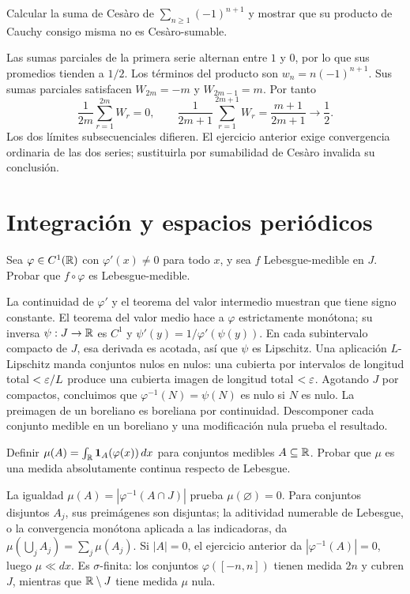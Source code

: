 \begin{ejercicio}\label{ej:v4-l01-8}
Calcular la suma de Cesàro de $\sum_{n\geq1}(-1)^{n+1}$ y mostrar que su producto de Cauchy consigo misma no es Cesàro-sumable.
\end{ejercicio}
\begin{solucion}
Las sumas parciales de la primera serie alternan entre $1$ y $0$, por lo que sus promedios tienden a $1/2$. Los términos del producto son $w_n=n(-1)^{n+1}$. Sus sumas parciales satisfacen $W_{2m}=-m$ y $W_{2m-1}=m$. Por tanto
\[
 \frac1{2m}\sum_{r=1}^{2m}W_r=0,
 \qquad \frac1{2m+1}\sum_{r=1}^{2m+1}W_r=\frac{m+1}{2m+1}\longrightarrow\frac12.
\]
Los dos límites subsecuenciales difieren. El ejercicio anterior exige convergencia ordinaria de las dos series; sustituirla por sumabilidad de Cesàro invalida su conclusión.
\end{solucion}

\chapter{Integración y espacios periódicos}

\begin{ejercicio}\label{ej:v4-l02-1}
Sea $\varphi\in C^1(\mathbb R)$ con $\varphi'(x)\ne0$ para todo $x$, y sea $f$ Lebesgue-medible en $J$. Probar que $f\circ\varphi$ es Lebesgue-medible.
\end{ejercicio}
\begin{solucion}
La continuidad de $\varphi'$ y el teorema del valor intermedio muestran que tiene signo constante. El teorema del valor medio hace a $\varphi$ estrictamente monótona; su inversa $\psi:J\to\mathbb R$ es $C^1$ y $\psi'(y)=1/\varphi'(\psi(y))$. En cada subintervalo compacto de $J$, esa derivada es acotada, así que $\psi$ es Lipschitz. Una aplicación $L$-Lipschitz manda conjuntos nulos en nulos: una cubierta por intervalos de longitud total $<\varepsilon/L$ produce una cubierta imagen de longitud total $<\varepsilon$. Agotando $J$ por compactos, concluimos que $\varphi^{-1}(N)=\psi(N)$ es nulo si $N$ es nulo. La preimagen de un boreliano es boreliana por continuidad. Descomponer cada conjunto medible en un boreliano y una modificación nula prueba el resultado.
\end{solucion}

\begin{ejercicio}\label{ej:v4-l02-2}
Definir $\mu(A)=\int_\mathbb R\mathbf1_A(\varphi(x))\,dx$ para conjuntos medibles $A\subseteq\mathbb R$. Probar que $\mu$ es una medida absolutamente continua respecto de Lebesgue.
\end{ejercicio}
\begin{solucion}
La igualdad $\mu(A)=|\varphi^{-1}(A\cap J)|$ prueba $\mu(\varnothing)=0$. Para conjuntos disjuntos $A_j$, sus preimágenes son disjuntas; la aditividad numerable de Lebesgue, o la convergencia monótona aplicada a las indicadoras, da $\mu(\bigcup_j A_j)=\sum_j\mu(A_j)$. Si $|A|=0$, el ejercicio anterior da $|\varphi^{-1}(A)|=0$, luego $\mu\ll dx$. Es $\sigma$-finita: los conjuntos $\varphi([-n,n])$ tienen medida $2n$ y cubren $J$, mientras que $\mathbb R\setminus J$ tiene medida $\mu$ nula.
\end{solucion}

